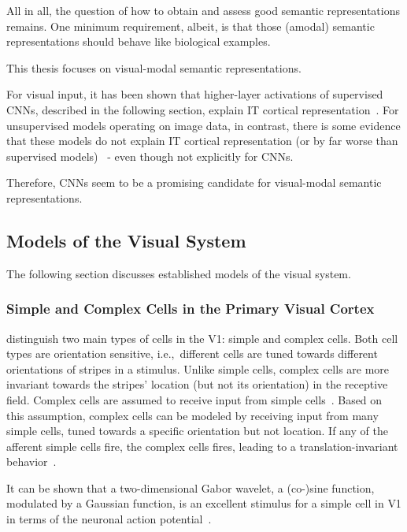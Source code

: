 All in all, the question of how to obtain and assess good semantic representations remains.
One minimum requirement, albeit, is that those (amodal) semantic representations should behave like biological examples.

This thesis focuses on visual-modal semantic representations.

For visual input, it has been shown that higher-layer activations of supervised \acp{CNN}, described in the following section, explain \ac{IT} cortical representation~\citep{khaligh2014deep,cadieu2014deep}.
For unsupervised models operating on image data, in contrast, there is some evidence that these models do not explain \ac{IT} cortical representation (or by far worse than supervised models)~\citep{khaligh2014deep} - even though not explicitly for \acp{CNN}.

Therefore, \acp{CNN} seem to be a promising candidate for visual-modal semantic representations.

\subsection{Models of the Visual System}\label{subsec:models-of-the-visual-system}

The following section discusses established models of the visual system.

\subsubsection{Simple and Complex Cells in the Primary Visual Cortex}\label{subsubseq:simple_complex_cells}

\citet{hubel1962receptive} distinguish two main types of cells in the \ac{V1}: simple and complex cells.
Both cell types are orientation sensitive, i.e.,~different cells are tuned towards different orientations of stripes in a stimulus.
Unlike simple cells, complex cells are more invariant towards the stripes' location (but not its orientation) in the receptive field.
Complex cells are assumed to receive input from simple cells~\citep{hubel1962receptive}.
Based on this assumption, complex cells can be modeled by receiving input from many simple cells, tuned towards a specific orientation but not location.
If any of the afferent simple cells fire, the complex cells fires, leading to a translation-invariant behavior~\citep{hubel1962receptive}.

It can be shown that a two-dimensional Gabor wavelet, a (co-)sine function, modulated by a Gaussian function, is an excellent stimulus for a simple cell in \ac{V1} in terms of the neuronal action potential~\citep{jones1987evaluation}.

